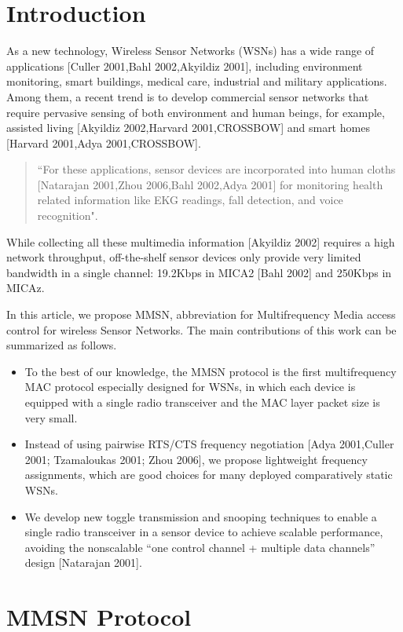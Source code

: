 \section{Introduction}

As a new technology, Wireless Sensor Networks (WSNs) has a wide
range of applications [Culler 2001,Bahl 2002,Akyildiz 2001], including
environment monitoring, smart buildings, medical care, industrial and
military applications. Among them, a recent trend is to develop
commercial sensor networks that require pervasive sensing of both
environment and human beings, for example, assisted living
[Akyildiz 2002,Harvard 2001,CROSSBOW] and smart homes
[Harvard 2001,Adya 2001,CROSSBOW].
\begin{quote}
  ``For these applications, sensor devices are incorporated into human
  cloths [Natarajan 2001,Zhou 2006,Bahl 2002,Adya 2001] for monitoring
  health related information like EKG readings, fall detection, and voice recognition".
\end{quote}
While collecting all these multimedia information
[Akyildiz 2002] requires a high network throughput, off-the-shelf
sensor devices only provide very limited bandwidth in a single
channel: 19.2Kbps in MICA2 [Bahl 2002] and 250Kbps in MICAz.

In this article, we propose MMSN, abbreviation for Multifrequency
Media access control for wireless Sensor Networks. The main
contributions of this work can be summarized as follows.
\begin{itemize}
  \item To the best of our knowledge, the MMSN protocol is the first
  multifrequency MAC protocol especially designed for WSNs, in which
  each device is equipped with a single radio transceiver and
  the MAC layer packet size is very small.
  \item Instead of using pairwise RTS/CTS frequency negotiation
  [Adya 2001,Culler 2001; Tzamaloukas 2001; Zhou 2006],
  we propose lightweight frequency assignments, which are good choices
  for many deployed comparatively static WSNs.
  \item We develop new toggle transmission and snooping techniques to
  enable a single radio transceiver in a sensor device to achieve
  scalable performance, avoiding the nonscalable ``one
  control channel + multiple data channels'' design [Natarajan 2001].
\end{itemize}

\section{MMSN Protocol}

